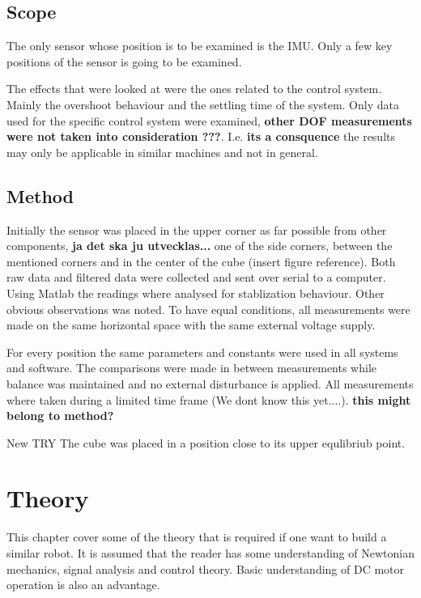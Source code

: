 \documentclass[a4paper,11pt]{kth-mag}
\begin{document}
\section{Scope}
The only sensor whose position is to be examined is the IMU. Only a few key positions of the sensor is going to be examined.

The effects that were looked at were the ones related to the control system. Mainly the overshoot behaviour and the settling time of the system. Only data used for the specific control system were examined, \textbf{other DOF measurements were not taken into consideration ???}. I.e. \textbf{its a consquence} the results may only be applicable in similar machines and not in general.



\section{Method}
Initially the sensor was placed in the upper corner as far possible from other components, \textbf{ja det ska ju utvecklas...} one of the side corners, between the mentioned corners and in the center of the cube (insert figure reference). Both raw data and filtered data were collected and sent over serial to a computer. Using Matlab \cite{MATLAB:2014} the readings where analysed for stablization behaviour. Other obvious observations was noted. To have equal conditions, all measurements were made on the same horizontal space with the same external voltage supply.

For every position the same parameters and constants were used in all systems and software. The comparisons were made in between measurements while balance was maintained and no external disturbance is applied. All measurements where taken during a limited time frame (We dont know this yet....).  \textbf{this might belong to method?}

New TRY
The cube was placed in a position close to its upper equlibriub point.

\chapter{Theory} \label{chapter: theory}
This chapter cover some of the theory that is required if one want to build a similar robot. It is assumed that the reader has some understanding of Newtonian mechanics, signal analysis and control theory. Basic understanding of DC motor operation is also an advantage.
\end{document}
